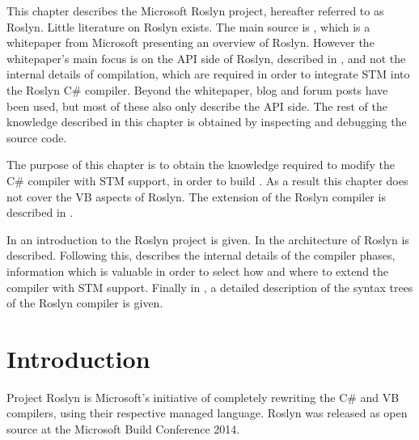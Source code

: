 \makeatletter {}\makeatother
{}
This chapter describes the Microsoft Roslyn project, hereafter referred to as Roslyn. Little literature on Roslyn exists. The main source is \cite{ng2012roslyn}, which is a whitepaper from Microsoft presenting an overview of Roslyn. However the whitepaper's main focus is on the API side of Roslyn, described in , and not the internal details of compilation, which are required in order to integrate \ac{STM} into the Roslyn C\# compiler. Beyond the whitepaper, blog and forum posts have been used, but most of these also only describe the API side. The rest of the knowledge described in this chapter is obtained by inspecting and debugging the source code.

The purpose of this chapter is to obtain the knowledge required to modify the C\# compiler with \ac{STM} support, in order to build \stmname. As a result this chapter does not cover the \ac{VB} aspects of Roslyn. The extension of the Roslyn compiler is described in .

In  an introduction to the Roslyn project is given. In  the architecture of Roslyn is described. Following this,  describes the internal details of the compiler phases, information which is valuable in order to select how and where to extend the compiler with \ac{STM} support. Finally in , a detailed description of the syntax trees of the Roslyn compiler is given.%
\label{chap:roslyn}

\section{Introduction}\label{sec:intro}
Project Roslyn is Microsoft's initiative of completely rewriting the C\# and \ac{VB} compilers, using their respective managed language. Roslyn was released as open source at the Microsoft Build Conference 2014\cite{csharpBuild}.


